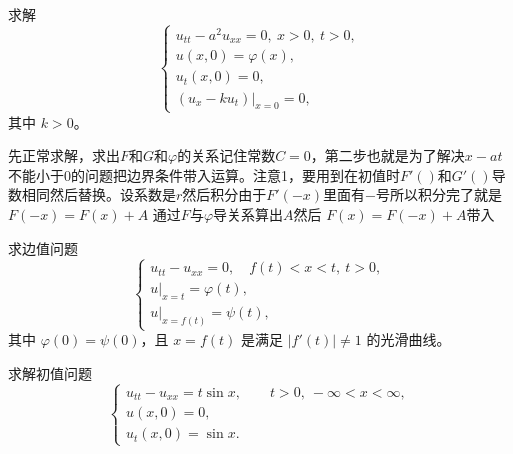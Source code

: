 \begin{homework}
[5] 求解
\[
\begin{cases}
u_{tt}-a^{2}u_{xx}=0,\ x>0,\ t>0,\\[4pt]
u(x,0)=\varphi(x),\\[4pt]
u_t(x,0)=0,\\[4pt]
(u_x-ku_t)|_{x=0}=0,
\end{cases}
\]
其中 $k>0$。
\end{homework}
\begin{dxtips}
   先正常求解，求出\(F\)和\(G\)和\(\varphi\)的关系记住常数\(C=0\)，第二步也就是为了解决\(x-at\)不能小于\(0\)的问题把边界条件带入运算。注意1，要用到在初值时\(F'()\)和\(G'()\)导数相同然后替换。设系数是\(r\)然后积分由于\(F'(-x)\)里面有\(-\)号所以积分完了就是\(F(-x)=F(x)+A\)
通过\(F\)与\(\varphi\)导关系算出\(A\)然后
\(F(x)=F(-x)+A\)带入
\end{dxtips}
\begin{homework}
[7] 求边值问题
\[
\begin{cases}
u_{tt}-u_{xx}=0,\quad f(t)<x<t,\ t>0,\\[4pt]
u|_{x=t}=\varphi(t),\\[4pt]
u|_{x=f(t)}=\psi(t),
\end{cases}
\]
其中 $\varphi(0)=\psi(0)$，且 $x=f(t)$ 是满足 $|f'(t)|\neq1$ 的光滑曲线。
\end{homework}

\begin{homework}
[8] 求解初值问题
\[
\begin{cases}
u_{tt}-u_{xx}=t\sin x,\qquad t>0,\ -\infty<x<\infty,\\[4pt]
u(x,0)=0,\\[4pt]
u_t(x,0)=\sin x.
\end{cases}
\]
\end{homework}



